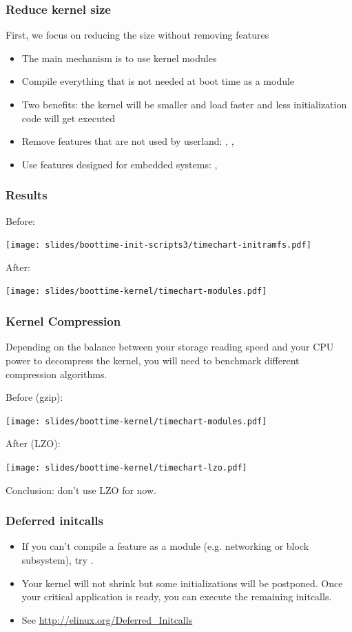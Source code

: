 \begin{frame}
\frametitle{Reduce kernel size}
First, we focus on reducing the size without removing features
\begin{itemize}
	\item The main mechanism is to use kernel modules
	\item Compile everything that is not needed at boot time as a
		module
	\item Two benefits: the kernel will be smaller and load faster and
		less initialization code will get executed
	\item Remove features that are not used by userland:
		, ,
	\item Use features designed for embedded systems:
		, 
\end{itemize}
\end{frame}

\begin{frame}
\frametitle{Results}
Before:
\begin{center}
    \texttt{[image: slides/boottime-init-scripts3/timechart-initramfs.pdf]}
\end{center}
After:
\begin{center}
    \texttt{[image: slides/boottime-kernel/timechart-modules.pdf]}
\end{center}
\end{frame}

\begin{frame}
\frametitle{Kernel Compression}
\small
Depending on the balance between your storage reading speed and your
CPU power to decompress the kernel, you will need to benchmark
different compression algorithms.

Before (gzip):
\begin{center}
    \texttt{[image: slides/boottime-kernel/timechart-modules.pdf]}
\end{center}
After (LZO):
\begin{center}
    \texttt{[image: slides/boottime-kernel/timechart-lzo.pdf]}
\end{center}
Conclusion: don't use LZO for now.
\end{frame}

\begin{frame}
\frametitle{Deferred initcalls}
\begin{itemize}
\item If you can't compile a feature as a module (e.g. networking or block
      subsystem), try .
\item Your kernel will not shrink but some initializations will be
      postponed. Once your critical application is ready, you can
      execute the remaining initcalls.
\item See \url{http://elinux.org/Deferred_Initcalls}
\end{itemize}
\end{frame}

